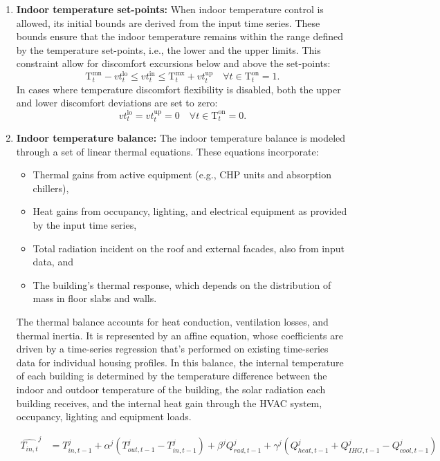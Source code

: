 \documentclass[11pt]{article}
\begin{document}
\begin{enumerate}
    \item \textbf{Indoor temperature set-points:}  
    When indoor temperature control is allowed, its initial bounds are derived from the input time series. These bounds ensure that the indoor temperature remains within the range defined by the temperature set-points, i.e., the lower and the upper limits. This constraint allow for discomfort excursions below and above the set-points:
    \[
    \text{T}_t^\text{mn} - vt^\text{lo}_t  \leq vt^\text{in}_t \leq \text{T}_t^\text{mx} + vt^\text{up}_t \quad \forall t \in \text{T}_t^\text{on} = 1.
    \]
    In cases where temperature discomfort flexibility is disabled, both the upper and lower discomfort deviations are set to zero:
    \[
    vt^\text{lo}_t = vt^\text{up}_t = 0 \quad \forall t \in \text{T}_t^\text{on} = 0.
    \]

    \item \textbf{Indoor temperature balance:}
    The indoor temperature balance is modeled through a set of linear thermal equations. These equations incorporate:
    \begin{itemize}
        \item Thermal gains from active equipment (e.g., CHP units and absorption chillers),
        \item Heat gains from occupancy, lighting, and electrical equipment as provided by the input time series,
        \item Total radiation incident on the roof and external facades, also from input data, and
        \item The building’s thermal response, which depends on the distribution of mass in floor slabs and walls.
    \end{itemize}
    The thermal balance accounts for heat conduction, ventilation losses, and thermal inertia. It is represented by an affine equation, whose coefficients are driven by a time-series regression that's performed on existing time-series data for individual housing profiles. In this balance, the internal temperature of each building is determined by the temperature difference between the indoor and outdoor temperature of the building, the solar radiation each building receives, and the internal heat gain through the HVAC system, occupancy, lighting and equipment loads.

    \begin{align*}
        \hat{T_{in, t}}^{j} &= T_{in, t-1}^{j} + \alpha^j (T_{out, t-1}^{j} - T_{in, t-1}^{j}) + \beta^j Q_{rad, t-1}^{j} + \gamma^j (Q_{heat, t-1}^{j} + Q_{IHG, t-1}^{j} - Q_{cool, t-1}^{j}) \label{eq:regression_baseline}
    \end{align*}


\end{enumerate}
\end{document}
